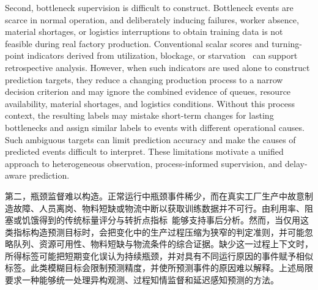 \documentclass[a4paper,fleqn]{cas-dc}
\newcommand{\zhpara}[1]{%
  \par\begingroup\small\color{black!72}\noindent #1\par\endgroup}
\begin{document}
Second, bottleneck supervision is difficult to construct. Bottleneck events are scarce in normal operation, and deliberately inducing failures, worker absence, material shortages, or logistics interruptions to obtain training data is not feasible during real factory production. Conventional scalar scores and turning-point indicators derived from utilization, blockage, or starvation~\cite{subramaniyan2023throughput,lai2021data,su2022dynamic} can support retrospective analysis. However, when such indicators are used alone to construct prediction targets, they reduce a changing production process to a narrow decision criterion and may ignore the combined evidence of queues, resource availability, material shortages, and logistics conditions. Without this process context, the resulting labels may mistake short-term changes for lasting bottlenecks and assign similar labels to events with different operational causes. Such ambiguous targets can limit prediction accuracy and make the causes of predicted events difficult to interpret. These limitations motivate a unified approach to heterogeneous observation, process-informed supervision, and delay-aware prediction.

\zhpara{第二，瓶颈监督难以构造。正常运行中瓶颈事件稀少，而在真实工厂生产中故意制造故障、人员离岗、物料短缺或物流中断以获取训练数据并不可行。由利用率、阻塞或饥饿得到的传统标量评分与转折点指标~\cite{subramaniyan2023throughput,lai2021data,su2022dynamic}能够支持事后分析。然而，当仅用这类指标构造预测目标时，会把变化中的生产过程压缩为狭窄的判定准则，并可能忽略队列、资源可用性、物料短缺与物流条件的综合证据。缺少这一过程上下文时，所得标签可能把短期变化误认为持续瓶颈，并对具有不同运行原因的事件赋予相似标签。此类模糊目标会限制预测精度，并使所预测事件的原因难以解释。上述局限要求一种能够统一处理异构观测、过程知情监督和延迟感知预测的方法。}
\end{document}
